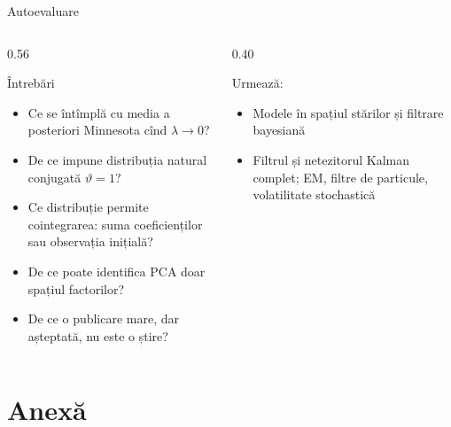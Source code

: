 \begin{frame}{Autoevaluare}
\itemsize{\small}
\begin{columns}[T]
\begin{column}{0.56\textwidth}
\begin{block}{Întrebări}
\begin{itemize}
    \item Ce se întîmplă cu media a posteriori Minnesota cînd $\lambda \to 0$?
    \item De ce impune distribuția natural conjugată $\vartheta = 1$?
    \item Ce distribuție permite cointegrarea: suma coeficienților sau observația inițială?
    \item De ce poate identifica PCA doar spațiul factorilor?
    \item De ce o publicare mare, dar așteptată, nu este o știre?
\end{itemize}
\end{block}
\end{column}
\begin{column}{0.40\textwidth}
\begin{block}{Urmează: }
\begin{itemize}
    \item Modele în spațiul stărilor și filtrare bayesiană
    \item Filtrul și netezitorul Kalman complet; EM, filtre de particule, volatilitate stochastică
\end{itemize}
\end{block}
\end{column}
\end{columns}
\end{frame}


\section{Anexă}

